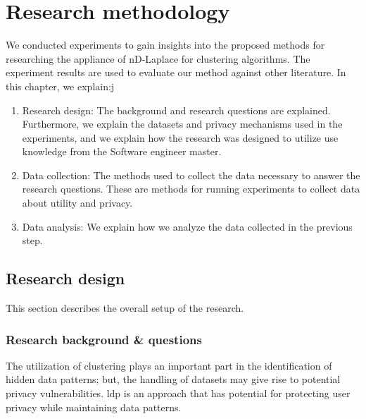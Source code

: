 \chapter{Research methodology}  \label{chapter:methodology}
We conducted experiments to gain insights into the proposed methods for researching the appliance of nD-Laplace for clustering algorithms.
The experiment results are used to evaluate our method against other literature.
In this chapter, we explain:j
\begin{enumerate}
    \item Research design: The background and research questions are explained.
          Furthermore, we explain the datasets and privacy mechanisms used in the experiments, and we explain how the research was designed to utilize use knowledge from the Software engineer master.
    \item Data collection: The methods used to collect the data necessary to answer the research questions.
          These are methods for running experiments to collect data about utility and privacy.
    \item Data analysis: We explain how we analyze the data collected in the previous step.
\end{enumerate}

\section{Research design}
This section describes the overall setup of the research.

\subsection{Research background \& questions}
The utilization of clustering plays an important part in the identification of hidden data patterns; but, the handling of datasets may give rise to potential privacy vulnerabilities. \gls{ldp} is an approach that has potential for protecting user privacy while maintaining data patterns.

